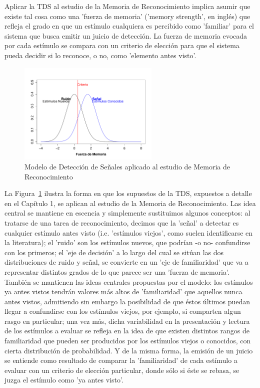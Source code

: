 Aplicar la TDS al estudio de la Memoria de Reconocimiento implica asumir que existe tal cosa como una 'fuerza de memoria' ('memory strength', en inglés) que refleja el grado en que un estímulo cualquiera es percibido como 'familiar' para el sistema que busca emitir un juicio de detección. La fuerza de memoria evocada por cada estímulo se compara con un criterio de elección para que el sistema pueda decidir si lo reconoce, o no, como 'elemento antes visto'.\\ 

\begin{figure}[th]
\centering
\includegraphics[width=0.60\textwidth]{Figures/RM_SDT_1} 
\decoRule
\caption[SDT en Memoria de Reconocimiento]{Modelo de Detección de Señales aplicado al estudio de Memoria de Reconocimiento}
\label{fig:RM_SDT_1}
\end{figure}

La Figura~\ref{fig:RM_SDT_1} ilustra la forma en que los supuestos de la TDS, expuestos a detalle en el Capítulo 1, se aplican al estudio de la Memoria de Reconocimiento. Las idea central se mantiene en escencia y simplemente sustituimos algunos conceptos: al tratarse de una tarea de reconocimiento, decimos que la 'señal' a detectar es cualquier estímulo antes visto (i.e. 'estímulos viejos', como suelen identificarse en la literatura); el 'ruido' son los estímulos nuevos, que podrían -o no- confundirse con los primeros; el 'eje de decisión' a lo largo del cual se sitúan las dos distribuciones de ruido y señal, se convierte en un 'eje de familiaridad' que va a representar distintos grados de lo que parece ser una 'fuerza de memoria'. También se mantienen las ideas centrales propuestas por el modelo: los estímulos ya antes vistos tendrán valores más altos de 'familiaridad' que aquellos nunca antes vistos, admitiendo sin embargo la posibilidad de que éstos últimos puedan llegar a confundirse con los estímulos viejos, por ejemplo, si comparten algun rasgo en particular; una vez más, dicha variabilidad en la presentación y lectura de los estímulos a evaluar se refleja en la idea de que existen distintos rangos de familiaridad que pueden ser producidos por los estímulos viejos o conocidos, con cierta distribución de probabilidad. Y de la misma forma, la emisión de un juicio se entiende como resultado de comparar la 'familiaridad' de cada estímulo a evaluar con un criterio de elección particular, donde sólo si éste se rebasa, se juzga el estímulo como 'ya antes visto'.\\

